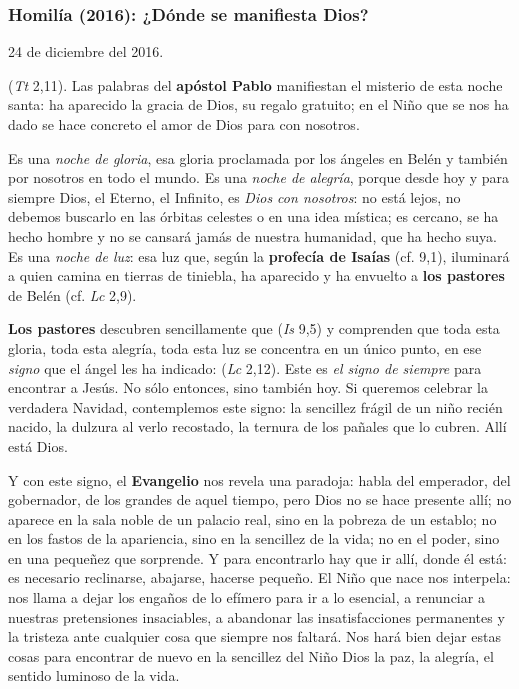 \subsubsection{Homilía (2016): ¿Dónde se manifiesta Dios?}

24 de diciembre del 2016.

 (\emph{Tt} 2,11). Las palabras del \textbf{apóstol Pablo} manifiestan el misterio de esta noche santa: ha aparecido la gracia de Dios, su regalo gratuito; en el Niño que se nos ha dado se hace concreto el amor de Dios para con nosotros.

Es una \emph{noche de gloria}, esa gloria proclamada por los ángeles en Belén y también por nosotros en todo el mundo. Es una \emph{noche de alegría}, porque desde hoy y para siempre Dios, el Eterno, el Infinito, es \emph{Dios con nosotros}: no está lejos, no debemos buscarlo en las órbitas celestes o en una idea mística; es cercano, se ha hecho hombre y no se cansará jamás de nuestra humanidad, que ha hecho suya. Es una \emph{noche de luz}: esa luz que, según la \textbf{profecía de Isaías} (cf. 9,1), iluminará a quien camina en tierras de tiniebla, ha aparecido y ha envuelto a \textbf{los pastores} de Belén (cf. \emph{Lc} 2,9).

\textbf{Los pastores} descubren sencillamente que  (\emph{Is} 9,5) y comprenden que toda esta gloria, toda esta alegría, toda esta luz se concentra en un único punto, en ese \emph{signo} que el ángel les ha indicado:  (\emph{Lc} 2,12). Este es \emph{el signo de siempre} para encontrar a Jesús. No sólo entonces, sino también hoy. Si queremos celebrar la verdadera Navidad, contemplemos este signo: la sencillez frágil de un niño recién nacido, la dulzura al verlo recostado, la ternura de los pañales que lo cubren. Allí está Dios.

Y con este signo, el \textbf{Evangelio} nos revela una paradoja: habla del emperador, del gobernador, de los grandes de aquel tiempo, pero Dios no se hace presente allí; no aparece en la sala noble de un palacio real, sino en la pobreza de un establo; no en los fastos de la apariencia, sino en la sencillez de la vida; no en el poder, sino en una pequeñez que sorprende. Y para encontrarlo hay que ir allí, donde él está: es necesario reclinarse, abajarse, hacerse pequeño. El Niño que nace nos interpela: nos llama a dejar los engaños de lo efímero para ir a lo esencial, a renunciar a nuestras pretensiones insaciables, a abandonar las insatisfacciones permanentes y la tristeza ante cualquier cosa que siempre nos faltará. Nos hará bien dejar estas cosas para encontrar de nuevo en la sencillez del Niño Dios la paz, la alegría, el sentido luminoso de la vida.

